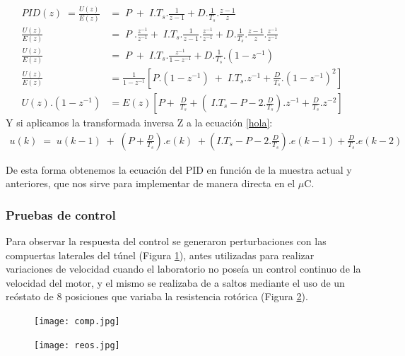      \begin{align}
    PID(z)\;=\frac{U(z)}{E(z)}&=\;P\;+\;I.T_s.\frac1{z-1}+D.\frac1{T_s}.\frac{z-1}z \label{PIDZ}  \\[0.4cm]
    \frac{U(z)}{E(z)}&=\;P\;.\frac{z^{-1}}{z^{-1}}+\;I.T_s.\frac1{z-1}.\frac{z^{-1}}{z^{-1}}+D.\frac1{T_s}.\frac{z-1}z.\frac{z^{-1}}{z^{-1}}\;\\[0.4cm]
    \frac{U(z)}{E(z)}&=\;P\;+\;I.T_s.\frac{z^{-1}}{1-z^{-1}}+D.\frac1{T_s}.(1-z^{-1})\\[0.4cm]
    \frac{U(z)}{E(z)}&=\frac1{1-z^{-1}}\left[P.\left(1-z^{-1}\right)\;+\;I.T_s.z^{-1}+\frac D{T_s}.(1-z^{-1})^2\right]\;\\[0.4cm]
    U(z).\left(1-z^{-1}\right)&=E(z)\left[P+\;\frac D{T_s}+\left(\;I.T_s-P-2.\frac D{T_s}\right).z^{-1}+\frac D{T_s}.z^{-2}\right]\;\label{hola}
    \end{align}
Y si aplicamos la transformada inversa Z a la ecuación \ref{hola}:
\begin{align}
	u(k)\;=\;u(k-1)\;+\;\left(P+\frac D{T_s}\right).e(k)\;+\left(I.T_s-P-2.\frac D{T_s}\right).e(k-1)+\frac D{T_s}.e(k-2)\label{ecdiscreta}
\end{align}

De esta forma obtenemos la ecuación del PID en función de la muestra actual y anteriores, que nos sirve para implementar de manera directa en el $\mu$C. 

\subsubsection{Pruebas de control}
Para observar la respuesta del control se generaron perturbaciones con las compuertas laterales del túnel (Figura \ref{fig:comp}), antes utilizadas para realizar variaciones de velocidad \cite{barila1993desarrollo} cuando el laboratorio no poseía un control continuo de la velocidad del motor, y el mismo se realizaba de a saltos mediante el uso de un reóstato de 8 posiciones que variaba la resistencia rotórica (Figura \ref{fig:reos}). 

\begin{figure}[H]
	\centering
	\texttt{[image: comp.jpg]}
	\label{fig:comp}
\end{figure}

\begin{figure}[H]
	\centering
	\texttt{[image: reos.jpg]}
	\label{fig:reos}
\end{figure}

